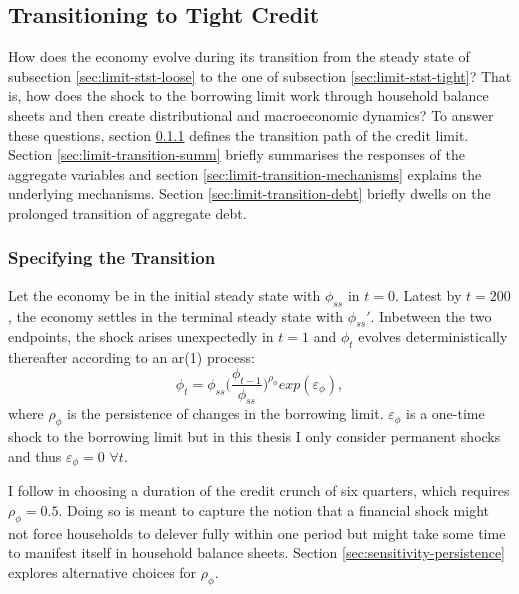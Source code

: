 \documentclass[a4paper,12pt]{article} %
\numberwithin{equation}{section} %
\numberwithin{figure}{section}
\numberwithin{table}{section}
\begin{document}
\subsection{Transitioning to Tight Credit}
\label{sec:limit-transition}

How does the economy evolve during its transition from the steady state of subsection \ref{sec:limit-stst-loose} to the one of subsection \ref{sec:limit-stst-tight}? That is, how does the shock to the borrowing limit work through household balance sheets and then create distributional and macroeconomic dynamics? To answer these questions, section \ref{sec:limit-transition-specific} defines the transition path of the credit limit. Section \ref{sec:limit-transition-summ} briefly summarises the responses of the aggregate variables and section \ref{sec:limit-transition-mechanisms} explains the underlying mechanisms. Section \ref{sec:limit-transition-debt} briefly dwells on the prolonged transition of aggregate debt.

\subsubsection{Specifying the Transition}
\label{sec:limit-transition-specific}

Let the economy be in the initial steady state with $\phi_{ss}$ in $t=0$. Latest by $t=200$, the economy settles in the terminal steady state with $\phi_{ss}'$. Inbetween the two endpoints, the shock arises unexpectedly in $t=1$ and $\phi_t$ evolves deterministically thereafter according to an \Gls{ar}(1) process:
\begin{equation}
    \phi_t = \phi_{ss} \Bigg( \frac{\phi_{t-1}}{\phi_{ss}} \Bigg)^{\rho_{\phi}} exp(\varepsilon_{\phi}), \label{eq:borrowing-limit-process}
\end{equation}
where $\rho_{\phi}$ is the persistence of changes in the borrowing limit. $\varepsilon_{\phi}$ is a one-time shock to the borrowing limit but in this thesis I only consider permanent shocks and thus $\varepsilon_{\phi} = 0$ $\forall t$.

I follow \textcite{gl2017} in choosing a duration of the credit crunch of six quarters, which requires $\rho_{\phi} = 0.5$. Doing so is meant to capture the notion that a financial shock might not force households to delever fully within one period but might take some time to manifest itself in household balance sheets. Section \ref{sec:sensitivity-persistence} explores alternative choices for $\rho_{\phi}$.
\end{document}
